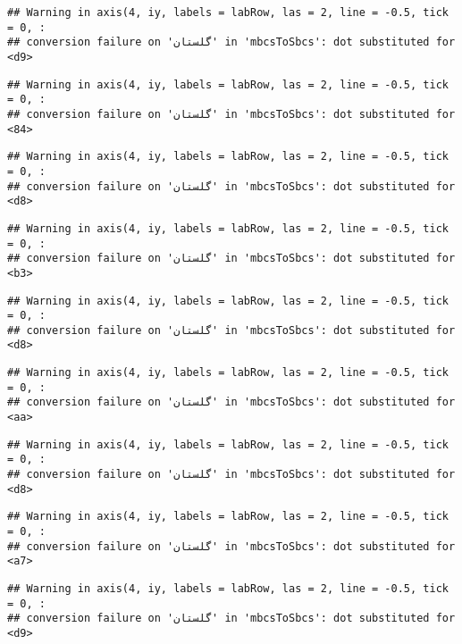 \documentclass[
]{article}
\begin{document}
\begin{verbatim}
## Warning in axis(4, iy, labels = labRow, las = 2, line = -0.5, tick = 0, :
## conversion failure on 'گلستان' in 'mbcsToSbcs': dot substituted for <d9>
\end{verbatim}

\begin{verbatim}
## Warning in axis(4, iy, labels = labRow, las = 2, line = -0.5, tick = 0, :
## conversion failure on 'گلستان' in 'mbcsToSbcs': dot substituted for <84>
\end{verbatim}

\begin{verbatim}
## Warning in axis(4, iy, labels = labRow, las = 2, line = -0.5, tick = 0, :
## conversion failure on 'گلستان' in 'mbcsToSbcs': dot substituted for <d8>
\end{verbatim}

\begin{verbatim}
## Warning in axis(4, iy, labels = labRow, las = 2, line = -0.5, tick = 0, :
## conversion failure on 'گلستان' in 'mbcsToSbcs': dot substituted for <b3>
\end{verbatim}

\begin{verbatim}
## Warning in axis(4, iy, labels = labRow, las = 2, line = -0.5, tick = 0, :
## conversion failure on 'گلستان' in 'mbcsToSbcs': dot substituted for <d8>
\end{verbatim}

\begin{verbatim}
## Warning in axis(4, iy, labels = labRow, las = 2, line = -0.5, tick = 0, :
## conversion failure on 'گلستان' in 'mbcsToSbcs': dot substituted for <aa>
\end{verbatim}

\begin{verbatim}
## Warning in axis(4, iy, labels = labRow, las = 2, line = -0.5, tick = 0, :
## conversion failure on 'گلستان' in 'mbcsToSbcs': dot substituted for <d8>
\end{verbatim}

\begin{verbatim}
## Warning in axis(4, iy, labels = labRow, las = 2, line = -0.5, tick = 0, :
## conversion failure on 'گلستان' in 'mbcsToSbcs': dot substituted for <a7>
\end{verbatim}

\begin{verbatim}
## Warning in axis(4, iy, labels = labRow, las = 2, line = -0.5, tick = 0, :
## conversion failure on 'گلستان' in 'mbcsToSbcs': dot substituted for <d9>
\end{verbatim}
\end{document}
